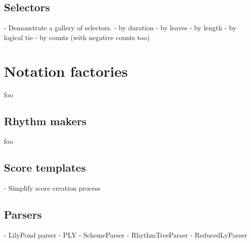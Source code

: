\subsection{Selectors}
\label{ssec:selectors}

\begin{markdown}
-   Demonstrate a gallery of selectors.
    -   by duration
    -   by leaves
    -   by length
    -   by logical tie
    -   by counts (with negative counts too)
\end{markdown}

\section{Notation factories}

foo

\subsection{Rhythm makers}

foo

\subsection{Score templates}
\label{ssec:score-templates}

\begin{markdown}
-   Simplify score creation process
\end{markdown}

\subsection{Parsers}

\begin{markdown}
-   LilyPond parser
-   PLY
-   SchemeParser
-   RhythmTreeParser
-   ReducedLyParser
\end{markdown}